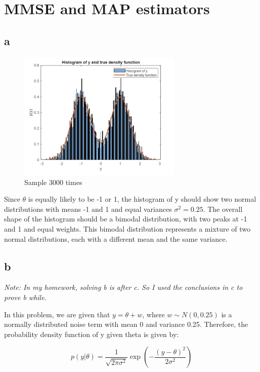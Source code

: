 \section{MMSE and MAP estimators}

\subsection{a}

\begin{figure}[H]
 \centering
 \includegraphics[width=0.7\textwidth]{images/graphfor4a.png}
 \caption{Sample 3000 times }
 \label{4a}
\end{figure}

Since $\theta$ is equally likely to be -1 or 1, the histogram of y should show two normal distributions with means -1 and 1 and equal variances $\sigma^2 = 0.25$. The overall shape of the histogram should be a bimodal distribution, with two peaks at -1 and 1 and equal weights. This bimodal distribution represents a mixture of two normal distributions, each with a different mean and the same variance.

\subsection{b}

\emph{Note: In my homework, solving b is after c. So I used the conclusions in c to prove b while.}

In this problem, we are given that $y = \theta + w$, where $w \sim N(0, 0.25)$ is a normally distributed noise term with mean 0 and variance 0.25. Therefore, the probability density function of y given theta is given by:

$$p(y | \theta) = \frac{1}{\sqrt{2\pi\sigma^2}} \exp \left(-\frac{(y - \theta)^2}{2\sigma^2}\right)$$

